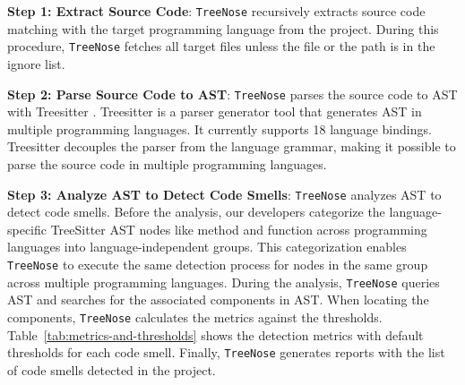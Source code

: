\textbf{Step 1: Extract Source Code}: \texttt{TreeNose} recursively extracts
source code matching with the target programming language from the
project. During this procedure, \texttt{TreeNose} fetches all target files
unless the file or the path is in the ignore list.

\textbf{Step 2: Parse Source Code to AST}: \texttt{TreeNose} parses the source
code to AST with Treesitter \cite{treeSitter}. Treesitter is a parser generator
tool that generates AST in multiple programming languages. It currently
supports 18 language bindings. Treesitter decouples the parser from the
language grammar, making it possible to parse the source code in multiple
programming languages.

\textbf{Step 3: Analyze AST to Detect Code Smells}: \texttt{TreeNose} analyzes
AST to detect code smells. Before the analysis, our developers categorize the
language-specific TreeSitter AST nodes like method and function across
programming languages into language-independent groups. This categorization
enables \texttt{TreeNose} to execute the same detection process for nodes in
the same group across multiple programming languages. During the analysis,
\texttt{TreeNose} queries AST and searches for the associated components in
AST. When locating the components, \texttt{TreeNose} calculates the metrics
against the thresholds. Table~\ref{tab:metrics-and-thresholds} shows the
detection metrics with default thresholds for each code smell. Finally,
\texttt{TreeNose} generates reports with the list of code smells detected in
the project.


